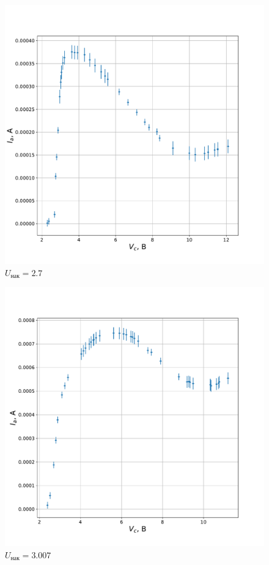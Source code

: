 \documentclass[a4paper, 12pt]{article}
\begin{document}
\begin{figure}[!h]
    \includegraphics[scale = 0.4]{graph1}
    \centering
    \caption{$U_{нак} = 2.7$}
    \label{pic:graph1}
\end{figure}

\begin{figure}[!h]
    \includegraphics[scale = 0.36]{graph2}
    \centering
    \caption{$U_{нак} = 3.007$}
    \label{pic:graph2}
\end{figure}
\end{document}
